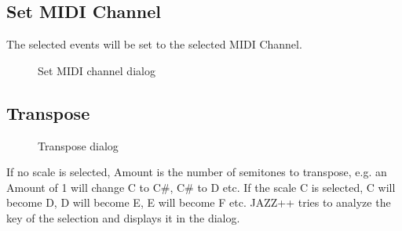 \documentclass[letterpaper]{report}
\begin{document}
\subsection{Set MIDI Channel}\label{setchan}

The selected events will be set to the selected MIDI Channel.

\begin{figure}
\caption{Set MIDI channel dialog}
\end{figure}


\subsection{Transpose}\label{transpose}

\begin{figure}
\caption{Transpose dialog}
\end{figure}

If no scale is selected, Amount is the number of semitones to transpose, e.g. an
Amount of 1 will change C to C\#, C\# to D etc. If the scale C is selected, C
will become D, D will become E, E will become F etc. JAZZ++ tries to analyze
the key of the selection and displays it in the dialog.
\end{document}

